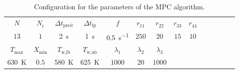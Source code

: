 \begin{table}[!h]
    \centering
    \caption[Configuration for the MPC algorithm.]
    {Configuration for the parameters of the MPC algorithm.}
    \begin{tabular}{cccccccccccccc}
        \toprule
        $N$ & $N_\text{r}$ & $\Delta t_\text{pred}$ & $\Delta t_\text{fp}$ & $f$ & $r_{11}$ & $r_{22}$ & $r_{33}$ &
        $r_{44}$ \\
        $13$ & $1$ & \SI{2}{\second} & \SI{1}{\second} & \SI{0.5}{\second^{-1}} & $250$ & $20$ & $15$ &
         $10$ \\
        \midrule
        $T_\text{max}$ & $X_\text{min}$ & 
        $T_{\text{w,lb}}$ & $T_{\text{w,ub}}$ & $\lambda_1$ & $\lambda_2$ & $\lambda_3$ \\
        \SI{630}{\kelvin} & $0.5$ & \SI{580}{\kelvin} & \SI{625}{\kelvin} &
        $1000$ & $20$ & $1000$ \\
        \bottomrule
    \end{tabular}
    \label{results:tab:MPC-configuration}
\end{table}

